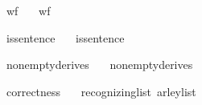 \begin{isabellebody}
\isanewline
{}\isamarkupfalse%
\ wf{\isacharunderscore}{\kern0pt}{\isasymG}{\isacharcolon}{\kern0pt}\isanewline
\ \ \ {\isachardoublequoteopen}wf{\isacharunderscore}{\kern0pt}{\isasymG}\ {\isasymG}{\isachardoublequoteclose}%
\isadelimproof
%
\endisadelimproof
%
\isatagproof
%
\endisatagproof
{\isafoldproof}%
%
\isadelimproof
%
\endisadelimproof
%
\begin{isamarkuptext}%
%
\end{isamarkuptext}\isamarkuptrue%
\isamarkupfalse%
\ is{\isacharunderscore}{\kern0pt}sentence{\isacharunderscore}{\kern0pt}{\isasymomega}{\isacharcolon}{\kern0pt}\isanewline
\ \ \ {\isachardoublequoteopen}is{\isacharunderscore}{\kern0pt}sentence\ {\isasymG}\ {\isasymomega}{\isachardoublequoteclose}%
\isadelimproof
%
\endisadelimproof
%
\isatagproof
%
\endisatagproof
{\isafoldproof}%
%
\isadelimproof
%
\endisadelimproof
%
\begin{isamarkuptext}%
%
\end{isamarkuptext}\isamarkuptrue%
\isamarkupfalse%
\ nonempty{\isacharunderscore}{\kern0pt}derives{\isacharcolon}{\kern0pt}\isanewline
\ \ \ {\isachardoublequoteopen}nonempty{\isacharunderscore}{\kern0pt}derives\ {\isasymG}{\isachardoublequoteclose}%
\isadelimproof
%
\endisadelimproof
%
\isatagproof
%
\endisatagproof
{\isafoldproof}%
%
\isadelimproof
%
\endisadelimproof
%
\begin{isamarkuptext}%
%
\end{isamarkuptext}\isamarkuptrue%
\isamarkupfalse%
\ correctness{\isacharcolon}{\kern0pt}\isanewline
\ \ \ {\isachardoublequoteopen}recognizing{\isacharunderscore}{\kern0pt}list\ {\isacharparenleft}{\kern0pt}{\isasymE}arley{\isacharunderscore}{\kern0pt}list\ {\isasymG}\ {\isasymomega}{\isacharparenright}{\kern0pt}\ {\isasymG}\ {\isasymomega}\ {\isasymlongleftrightarrow}\ {\isasymG}\ {\isasymturnstile}\ {\isacharbrackleft}{\kern0pt}{\isasymSS}\ {\isasymG}{\isacharbrackright}{\kern0pt}\ {\isasymRightarrow}\isactrlsup {\isacharasterisk}{\kern0pt}\ {\isasymomega}{\isachardoublequoteclose}%
\isadelimproof
%
\endisadelimproof
%
\isatagproof
%
\endisatagproof
{\isafoldproof}%
%
\isadelimproof
%
\endisadelimproof
%
\isadelimtheory
%
\endisadelimtheory
%
\isatagtheory
%
\endisatagtheory
{\isafoldtheory}%
%
\isadelimtheory
%
\endisadelimtheory
%
\end{isabellebody}%
\endinput
